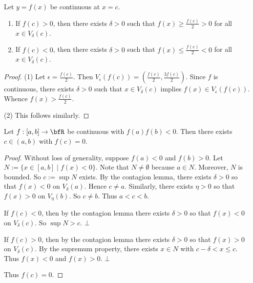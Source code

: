     \begin{lemma}
        Let $y = f(x)$ be continuous at $x = c$.
            \begin{enumerate}[label = (\arabic*)]
                \item If $f(c) > 0$, then there exists $\delta > 0$ such that $f(x) \geq \frac{f(c)}{2} > 0$ for all $x \in V_\delta(c)$.
                \item If $f(c) < 0$, then there exists $\delta > 0$ such that $f(x) \leq \frac{f(c)}{2} < 0$ for all $x \in V_\delta(c)$.
            \end{enumerate}
    \end{lemma}
        \begin{proof}
            (1) Let $\epsilon = \frac{f(c)}{2}$. Then $V_\epsilon(f(c)) = \left(\frac{f(c)}{2},\frac{3f(c)}{2}\right)$. Since $f$ is continuous, there exists $\delta > 0$ such that $x \in V_\delta(c)$ implies $f(x) \in V_\epsilon(f(c))$. Whence $f(x) > \frac{f(c)}{2}$. \nl

            (2) This follows similarly.
        \end{proof}

    \begin{lemma}
        Let $f:[a,b] \rightarrow \bfR$ be continuous with $f(a)f(b) < 0$. Then there exists $c \in (a,b)$ with $f(c) = 0$.
    \end{lemma}
        \begin{proof}
            Without loss of generality, suppose $f(a) < 0$ and $f(b) > 0$. Let $N:=\{x \in [a,b]\mid f(x) < 0\}$. Note that $N \neq \emptyset$ because $a \in N$. Moreover, $N$ is bounded. So $c:=\sup N$ exists. By the contagion lemma, there exists $\delta >0$ so that $f(x) < 0$ on $V_\delta(a)$. Hence $c \neq a$. Similarly, there exists $\eta > 0$ so that $f(x) > 0$ on $V_\eta(b)$. So $c \neq b$. Thus $a < c < b$. \nl

            If $f(c) < 0$, then by the contagion lemma there exists $\delta > 0$ so that $f(x) < 0$ on $V_\delta(c)$. So $\sup N > c$. $\bot$ \nl

            If $f(c) > 0$, then by the contagion lemma there exists $\delta >0$ so that $f(x) > 0$ on $V_\delta(c)$. By the supremum property, there exists $x \in N$ with $c - \delta < x \leq c$. Thus $f(x) < 0$ and $f(x) > 0$. $\bot$ \nl
            
            Thus $f(c) = 0$.
        \end{proof}

